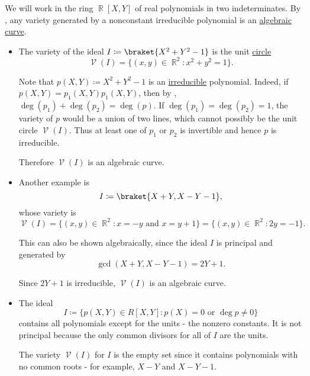 \begin{example}\label{ex:affine_varieties}
  We will work in the ring \( \BbbR[X, Y] \) of real polynomials in two indeterminates. By , any variety generated by a nonconstant irreducible polynomial is an \hyperref[def:affine_variety/algebraic_curve]{algebraic curve}.

  \begin{itemize}
    \item The variety of the ideal \( I \coloneqq \braket{X^2 + Y^2 - 1} \) is the unit \hyperref[def:quadratic_plane_curve/ellipse]{circle}
          \begin{equation*}
            \mscrV(I) = \{ (x, y) \in \BbbR^2 \colon x^2 + y^2 = 1 \}.
          \end{equation*}

          Note that \( p(X, Y) \coloneqq X^2 + Y^2 - 1 \) is an \hyperref[def:irreducible_ring_element]{irreducible} polynomial. Indeed, if \( p(X, Y) = p_1(X, Y) p_1(X, Y) \), then by , \( \deg(p_1) + \deg(p_2) = \deg(p) \). If \( \deg(p_1) = \deg(p_2) = 1 \), the variety of \( p \) would be a union of two lines, which cannot possibly be the unit circle \( \mscrV(I) \). Thus at least one of \( p_1 \) or \( p_2 \) is invertible and hence \( p \) is irreducible.

          Therefore \( \mscrV(I) \) is an algebraic curve.

    \item Another example is
          \begin{equation*}
            I \coloneqq \braket{X + Y, X - Y - 1},
          \end{equation*}
          whose variety is
          \begin{equation*}
            \mscrV(I) = \{ (x, y) \in \BbbR^2 \colon x = -y \text{ and } x = y + 1 \} = \{ (x, y) \in \BbbR^2 \colon 2y = -1 \}.
          \end{equation*}

          This can also be shown algebraically, since the ideal \( I \) is principal and generated by
          \begin{equation*}
            \gcd(X + Y, X - Y - 1) = 2Y + 1.
          \end{equation*}

          Since \( 2Y + 1 \) is irreducible, \( \mscrV(I) \) is an algebraic curve.

    \item The ideal
          \begin{equation*}
            I \coloneqq \{ p(X, Y) \in R[X, Y] \colon p(X) = 0 \text{ or } \deg p \neq 0 \}
          \end{equation*}
          contains all polynomials except for the units - the nonzero constants. It is not principal because the only common divisors for all of \( I \) are the units.

          The variety \( \mscrV(I) \) for \( I \) is the empty set since it contains polynomials with no common roots - for example, \( X - Y \) and \( X - Y - 1 \).
  \end{itemize}
\end{example}

